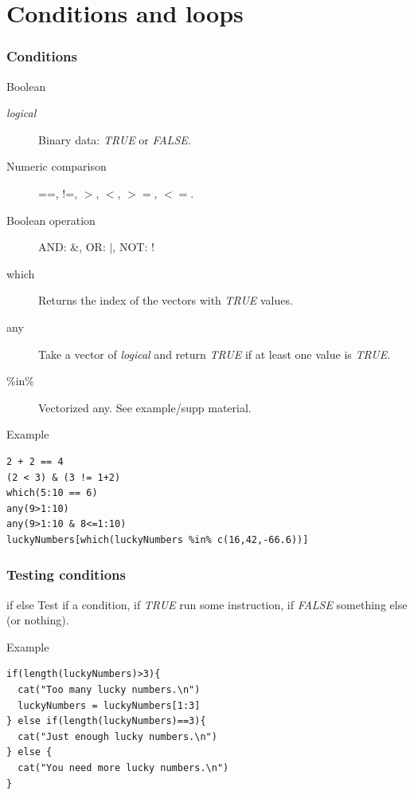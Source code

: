 \documentclass[10pt]{beamer}
\newenvironment{xframe}[2][]
  {\begin{frame}[fragile,environment=xframe,#1]
  \frametitle{#2}}
  {\end{frame}}
\begin{document}
\section{Conditions and loops}
\begin{xframe}{Conditions}
  \begin{block}{Boolean}
    \begin{description}
    \item[{\it logical}] Binary data: {\it TRUE} or {\it FALSE}.
    \item[Numeric comparison] {\sf ==}, {\sf !=}, {\sf $>$}, {\sf $<$}, {\sf $>=$}, {\sf $<=$}.
    \item[Boolean operation] AND: \&, OR: $|$, NOT: !
    \item[which] Returns the index of the vectors with {\it TRUE} values.
    \item[any] Take a vector of {\it logical} and return {\it TRUE} if at least one value is {\it TRUE}.
    \item[\%in\%] Vectorized any. See example/supp material.
    \end{description}
  \end{block}
  \begin{exampleblock}{Example}
\begin{verbatim}
2 + 2 == 4
(2 < 3) & (3 != 1+2)
which(5:10 == 6)
any(9>1:10)
any(9>1:10 & 8<=1:10)
luckyNumbers[which(luckyNumbers %in% c(16,42,-66.6))]
\end{verbatim}  
  \end{exampleblock}
\end{xframe}


\begin{xframe}{Testing conditions}
  \begin{block}{{\sf if else}}
    Test if a condition, if {\it TRUE} run some instruction, if {\it FALSE} something else (or nothing).
  \end{block}
  \begin{exampleblock}{Example}
\begin{verbatim}
if(length(luckyNumbers)>3){
  cat("Too many lucky numbers.\n")
  luckyNumbers = luckyNumbers[1:3]
} else if(length(luckyNumbers)==3){
  cat("Just enough lucky numbers.\n")
} else {
  cat("You need more lucky numbers.\n")
}
\end{verbatim}  
  \end{exampleblock}
\end{xframe}
\end{document}
